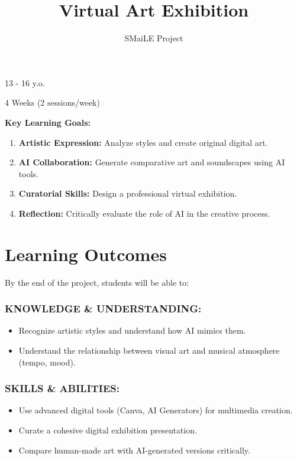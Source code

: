 \documentclass[11pt, a4paper]{article}
\begin{document}
\title{\textbf{\color{SmailePink}Virtual Art Exhibition}}
\author{SMaiLE Project}
\date{}
\maketitle
\thispagestyle{plain}

\begin{keyinfobox}
    \begin{description}[leftmargin=*, labelindent=0pt]
        \item[\bfseries\color{SmailePink} Target Group:] 13 - 16 y.o.
        \item[\bfseries\color{SmailePink} Duration:] 4 Weeks (2 sessions/week)
    \end{description}
    \textbf{Key Learning Goals:}
    \begin{enumerate}
        \item \textbf{Artistic Expression:} Analyze styles and create original digital art.
        \item \textbf{AI Collaboration:} Generate comparative art and soundscapes using AI tools.
        \item \textbf{Curatorial Skills:} Design a professional virtual exhibition.
        \item \textbf{Reflection:} Critically evaluate the role of AI in the creative process.
    \end{enumerate}
\end{keyinfobox}

\section*{Learning Outcomes}
By the end of the project, students will be able to:

\subsubsection*{KNOWLEDGE \& UNDERSTANDING:}
\begin{itemize}
    \item Recognize artistic styles and understand how AI mimics them.
    \item Understand the relationship between visual art and musical atmosphere (tempo, mood).
\end{itemize}

\subsubsection*{SKILLS \& ABILITIES:}
\begin{itemize}
    \item Use advanced digital tools (Canva, AI Generators) for multimedia creation.
    \item Curate a cohesive digital exhibition presentation.
    \item Compare human-made art with AI-generated versions critically.
\end{itemize}
\end{document}
